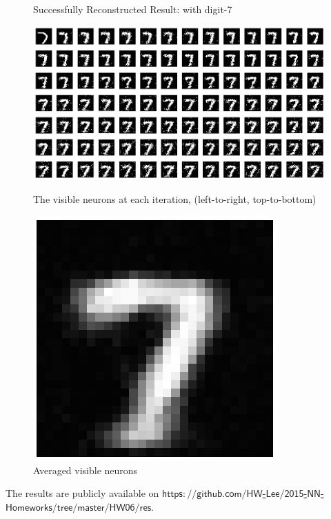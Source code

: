\documentclass[12pt]{article}
\begin{document}
\begin{figure}[ht]
	\begin{center}
		Successfully Reconstructed Result: with digit-7
	\end{center}
	\begin{minipage}[c]{0.55\linewidth}
	\centering
	\includegraphics[scale=.3]{../res/chgVisible1.png}
	\caption{The visible neurons at each iteration, (left-to-right, top-to-bottom)}
	\end{minipage}
	\hspace{4em}
	\begin{minipage}[c]{0.35\linewidth}
	\centering
	\vspace{-1em}
	\includegraphics[scale=.45]{../res/avgVisible1.png}
	\caption{Averaged visible neurons}
	\end{minipage}
\end{figure}

\begin{center}
	The results are publicly available on \href{https://github.com/HW-Lee/2015-NN-Homeworks/tree/master/HW06/res}{$\mathsf{https://github.com/HW}$-$\mathsf{Lee/2015}$-$\mathsf{NN}$-$\mathsf{Homeworks/tree/master/HW06/res}$}.
\end{center}
\end{document}
